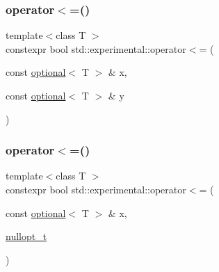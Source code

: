 \mbox{\label{namespacestd_1_1experimental_afd5e1ebb8edd29dc3916bf546c9ffca3}} 
\subsubsection{\texorpdfstring{operator$<$=()}{operator<=()}\hspace{0.1cm}{\footnotesize\ttfamily [1/9]}}
{\footnotesize\ttfamily template$<$class T $>$ \\
constexpr bool std\+::experimental\+::operator$<$= (\begin{DoxyParamCaption}\item[{const \hyperlink{classstd_1_1experimental_1_1optional}{optional}$<$ T $>$ \&}]{x,  }\item[{const \hyperlink{classstd_1_1experimental_1_1optional}{optional}$<$ T $>$ \&}]{y }\end{DoxyParamCaption})}

\mbox{\label{namespacestd_1_1experimental_a2130b2ce528946a4ef4e56f80d823267}} 
\subsubsection{\texorpdfstring{operator$<$=()}{operator<=()}\hspace{0.1cm}{\footnotesize\ttfamily [2/9]}}
{\footnotesize\ttfamily template$<$class T $>$ \\
constexpr bool std\+::experimental\+::operator$<$= (\begin{DoxyParamCaption}\item[{const \hyperlink{classstd_1_1experimental_1_1optional}{optional}$<$ T $>$ \&}]{x,  }\item[{\hyperlink{structstd_1_1experimental_1_1nullopt__t}{nullopt\+\_\+t}}]{ }\end{DoxyParamCaption})\hspace{0.3cm}{\ttfamily [noexcept]}}

\mbox{\label{namespacestd_1_1experimental_ae72fae9caf85b2dff2e94ebd29371937}} 
